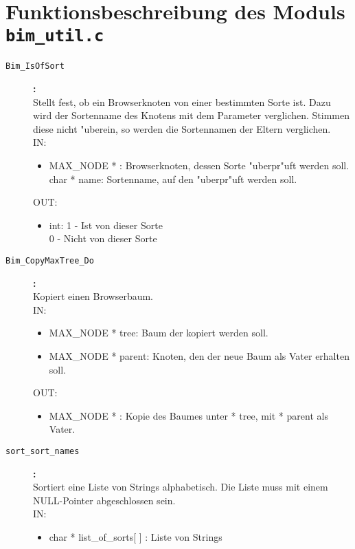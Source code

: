 \section{Funktionsbeschreibung des Moduls {\tt bim\_util.c}}

\begin{description}

\item[\tt Bim\_IsOfSort
]{\bf :\\}
Stellt fest, ob ein Browserknoten von einer bestimmten Sorte
 ist. Dazu wird der Sortenname des Knotens mit dem Parameter verglichen.
 Stimmen diese nicht "uberein, so werden die Sortennamen der Eltern
 verglichen.
 \\
IN:
\begin{itemize}
   \item MAX\_NODE * : Browserknoten, dessen Sorte "uberpr"uft werden soll.
char * name: Sortenname, auf den "uberpr"uft werden soll.

\end{itemize}
OUT:
\begin{itemize}
   \item int:	1 - Ist von dieser Sorte  \\
0 - Nicht von dieser Sorte

\end{itemize}
\item[\tt Bim\_CopyMaxTree\_Do
]{\bf :\\}
Kopiert einen Browserbaum.
  \\
IN:
\begin{itemize}
   \item MAX\_NODE * tree: Baum der kopiert werden soll.
\item MAX\_NODE * parent: Knoten, den der neue Baum als Vater erhalten
soll.

\end{itemize}
OUT:
\begin{itemize}
   \item MAX\_NODE * : Kopie des Baumes unter * tree, mit * parent als
Vater.

\end{itemize}

\item[\tt sort\_sort\_names
]{\bf :\\}
Sortiert eine Liste von Strings alphabetisch. Die Liste muss
 mit einem NULL-Pointer abgeschlossen sein.
  \\
IN:
\begin{itemize}
   \item char * list\_of\_sorts[ ] : Liste von Strings


\end{itemize}
\end{description}
